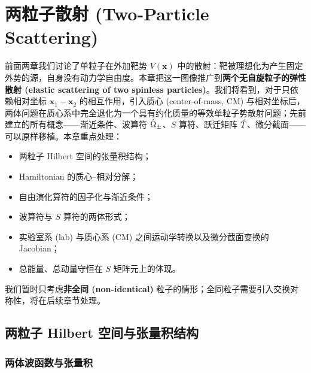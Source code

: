 \chapter{两粒子散射 (Two-Particle Scattering)}\label{ch:scat2p}

前面两章我们讨论了单粒子在外加靶势 $V(\bm{x})$ 中的散射：靶被理想化为产生固定外势的源，自身没有动力学自由度。本章把这一图像推广到\textbf{两个无自旋粒子的弹性散射 (elastic scattering of two spinless particles)}。我们将看到，对于只依赖相对坐标 $\bm{x}_1-\bm{x}_2$ 的相互作用，引入质心 (center-of-mass, CM) 与相对坐标后，两体问题在质心系中完全退化为一个具有约化质量的等效单粒子势散射问题；先前建立的所有概念——渐近条件、波算符 $\hat{\Omega}_{\pm}$、$S$ 算符、跃迁矩阵 $\hat{T}$、微分截面——可以原样移植。本章重点处理：
\begin{itemize}
  \item 两粒子 Hilbert 空间的张量积结构；
  \item Hamiltonian 的质心–相对分解；
  \item 自由演化算符的因子化与渐近条件；
  \item 波算符与 $S$ 算符的两体形式；
  \item 实验室系 (lab) 与质心系 (CM) 之间运动学转换以及微分截面变换的 Jacobian；
  \item 总能量、总动量守恒在 $S$ 矩阵元上的体现。
\end{itemize}
我们暂时只考虑\textbf{非全同 (non-identical)} 粒子的情形；全同粒子需要引入交换对称性，将在后续章节处理。

\section{两粒子 Hilbert 空间与张量积结构}

\subsection{两体波函数与张量积}

